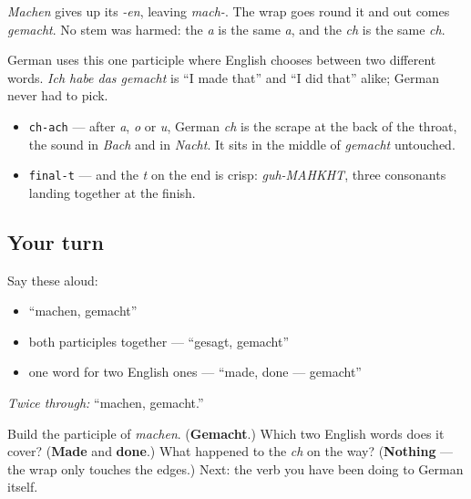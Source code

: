 \emph{Machen} gives up its \emph{-en}, leaving \emph{mach-}. The wrap goes round it and out comes \emph{gemacht}. No stem was harmed: the \emph{a} is the same \emph{a}, and the \emph{ch} is the same \emph{ch}.

German uses this one participle where English chooses between two different words. \emph{Ich habe das gemacht} is \textquotedblleft{}I made that\textquotedblright{} and \textquotedblleft{}I did that\textquotedblright{} alike; German never had to pick.

\begin{sounds}
\begin{itemize}
\raggedright
  \item \texttt{ch-ach} — after \emph{a}, \emph{o} or \emph{u}, German \emph{ch} is the scrape at the back of the throat, the sound in \emph{Bach} and in \emph{Nacht}. It sits in the middle of \emph{gemacht} untouched.
  \item \texttt{final-t} — and the \emph{t} on the end is crisp: \emph{guh-MAHKHT}, three consonants landing together at the finish.
\end{itemize}
\end{sounds}

\subsection*{Your turn}
Say these aloud:

\begin{itemize}
\raggedright
  \item \textquotedblleft{}machen, gemacht\textquotedblright{}
  \item both participles together — \textquotedblleft{}gesagt, gemacht\textquotedblright{}
  \item one word for two English ones — \textquotedblleft{}made, done — gemacht\textquotedblright{}
\end{itemize}

\emph{Twice through:} \textquotedblleft{}machen, gemacht.\textquotedblright{}

\begin{tcolorbox}[breakable,colback=teal!4,colframe=teal!35!black,title={Before you move on}]
Build the participle of \emph{machen}. (\textbf{Gemacht}.) Which two English words does it cover? (\textbf{Made} and \textbf{done}.) What happened to the \emph{ch} on the way? (\textbf{Nothing} — the wrap only touches the edges.) Next: the verb you have been doing to German itself.
\end{tcolorbox}
